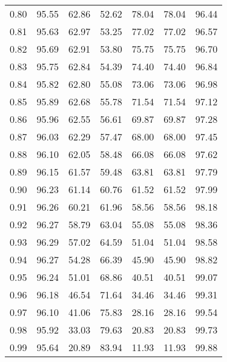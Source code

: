 \begin{tabular}{|c|c|c|c|c|c|c|}
      0.80 &     95.55 &     62.86 &      52.62 &   78.04 &      78.04 &         96.44 \\
      0.81 &     95.63 &     62.97 &      53.25 &   77.02 &      77.02 &         96.57 \\
      0.82 &     95.69 &     62.91 &      53.80 &   75.75 &      75.75 &         96.70 \\
      0.83 &     95.75 &     62.84 &      54.39 &   74.40 &      74.40 &         96.84 \\
      0.84 &     95.82 &     62.80 &      55.08 &   73.06 &      73.06 &         96.98 \\
      0.85 &     95.89 &     62.68 &      55.78 &   71.54 &      71.54 &         97.12 \\
      0.86 &     95.96 &     62.55 &      56.61 &   69.87 &      69.87 &         97.28 \\
      0.87 &     96.03 &     62.29 &      57.47 &   68.00 &      68.00 &         97.45 \\
      0.88 &     96.10 &     62.05 &      58.48 &   66.08 &      66.08 &         97.62 \\
      0.89 &     96.15 &     61.57 &      59.48 &   63.81 &      63.81 &         97.79 \\
      0.90 &     96.23 &     61.14 &      60.76 &   61.52 &      61.52 &         97.99 \\
      0.91 &     96.26 &     60.21 &      61.96 &   58.56 &      58.56 &         98.18 \\
      0.92 &     96.27 &     58.79 &      63.04 &   55.08 &      55.08 &         98.36 \\
      0.93 &     96.29 &     57.02 &      64.59 &   51.04 &      51.04 &         98.58 \\
      0.94 &     96.27 &     54.28 &      66.39 &   45.90 &      45.90 &         98.82 \\
      0.95 &     96.24 &     51.01 &      68.86 &   40.51 &      40.51 &         99.07 \\
      0.96 &     96.18 &     46.54 &      71.64 &   34.46 &      34.46 &         99.31 \\
      0.97 &     96.10 &     41.06 &      75.83 &   28.16 &      28.16 &         99.54 \\
      0.98 &     95.92 &     33.03 &      79.63 &   20.83 &      20.83 &         99.73 \\
      0.99 &     95.64 &     20.89 &      83.94 &   11.93 &      11.93 &         99.88 \\
\bottomrule
\end{tabular}

